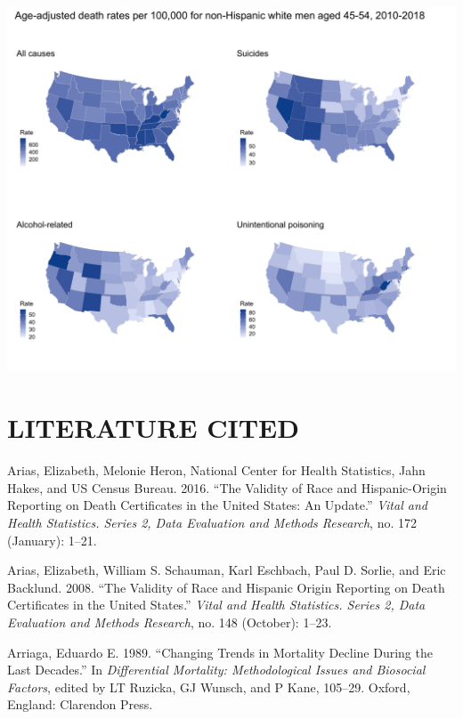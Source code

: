 \documentclass[
  11pt,
]{article}
\begin{document}
\includegraphics[width=1\linewidth]{../figures/nhwm-45-54-maps}

\newpage

\hypertarget{literature-cited}{%
\section*{\textbar{} LITERATURE CITED}\label{literature-cited}}

\hypertarget{refs}{}
\leavevmode\hypertarget{ref-arias2016}{}%
Arias, Elizabeth, Melonie Heron, National Center for Health Statistics,
Jahn Hakes, and US Census Bureau. 2016. ``The Validity of Race and
Hispanic-Origin Reporting on Death Certificates in the United States: An
Update.'' \emph{Vital and Health Statistics. Series 2, Data Evaluation
and Methods Research}, no. 172 (January): 1--21.

\leavevmode\hypertarget{ref-arias2008}{}%
Arias, Elizabeth, William S. Schauman, Karl Eschbach, Paul D. Sorlie,
and Eric Backlund. 2008. ``The Validity of Race and Hispanic Origin
Reporting on Death Certificates in the United States.'' \emph{Vital and
Health Statistics. Series 2, Data Evaluation and Methods Research}, no.
148 (October): 1--23.

\leavevmode\hypertarget{ref-arriaga1989}{}%
Arriaga, Eduardo E. 1989. ``Changing Trends in Mortality Decline During
the Last Decades.'' In \emph{Differential Mortality: Methodological
Issues and Biosocial Factors}, edited by LT Ruzicka, GJ Wunsch, and P
Kane, 105--29. Oxford, England: Clarendon Press.
\end{document}
